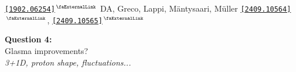 \documentclass[aspectratio=169,11pt,usenames,dvipsnames]{beamer}
\begin{document}
\begin{frame}
{     \hspace{16pt}\href{https://arxiv.org/abs/1902.06254}{{\color{starrysecond}\texttt{[1902.06254]$^\text{\scalebox{0.9}{\faExternalLink}}$}}} DA, Greco, Lappi, Mäntysaari, M\"{u}ller \href{https://arxiv.org/abs/2409.10564}{\color{starrysecond}\texttt{[2409.10564]}$^\text{\scalebox{0.9}{\faExternalLink}}$}, \href{https://arxiv.org/abs/2409.10565}{\color{starrysecond}\texttt{[2409.10565]}$^\text{\scalebox{0.9}{\faExternalLink}}$}}
\end{frame}



\begin{frame}{}
    \begin{center}
        \vspace{1cm}
        {\Large\color{normal}\color{jyured}\bfseries Question 4:}\\[0.3cm]
        {\huge\color{destacado}Glasma improvements?}\\[0.4cm]
        {\large\textit{3+1D, proton shape, fluctuations...}}
    \end{center}
\end{frame}


\end{document}
